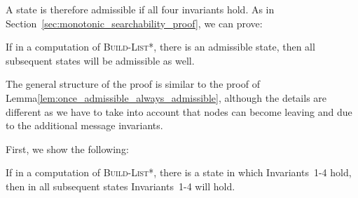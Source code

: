 \documentclass[a4paper,USenglish]{lipics}
\newcommand{\blpp}{\textsc{Build-List*}\xspace}
\begin{document}
A state is therefore admissible if all four invariants hold.
As in Section~\ref{sec:monotonic_searchability_proof}, we can prove:
\begin{lemma}\label{lem:blpp_once_admissible_always_admissible}
 If in a computation of \blpp, there is an admissible state, then all subsequent states will be admissible as well.
\end{lemma}
The general structure of the proof is similar to the proof of Lemma\ref{lem:once_admissible_always_admissible}, although the details are different as we have to take into account that nodes can become leaving and due to the additional message invariants.

First, we show the following:
\begin{lemma}\label{lem:blpp_once_first_four_invariants_hold_then_always}
 If in a computation of \blpp, there is a state in which Invariants~1-4 hold, then in all subsequent states Invariants~1-4 will hold.
\end{lemma}
\end{document}
